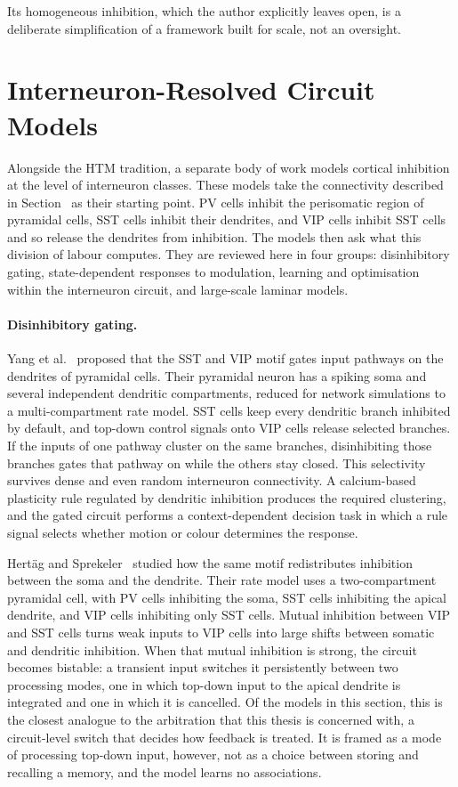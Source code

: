 Its homogeneous inhibition, which the author explicitly leaves open, is a
deliberate simplification of a framework built for scale, not an oversight.

\section{Interneuron-Resolved Circuit Models}
\label{sec:comp-interneuron}

Alongside the HTM tradition, a separate body of work models cortical inhibition
at the level of interneuron classes. These models take the connectivity
described in Section~ as their starting point. PV cells inhibit the
perisomatic region of pyramidal cells, SST cells inhibit their dendrites, and
VIP cells inhibit SST cells and so release the dendrites from inhibition. The
models then ask what this division of labour computes. They are reviewed here in
four groups: disinhibitory gating, state-dependent responses to modulation,
learning and optimisation within the interneuron circuit, and large-scale
laminar models.

\paragraph{Disinhibitory gating.}
Yang et al.~\cite{yang2016gating} proposed that the SST and VIP motif gates
input pathways on the dendrites of pyramidal cells. Their pyramidal neuron has a
spiking soma and several independent dendritic compartments, reduced for
network simulations to a multi-compartment rate model. SST cells keep every
dendritic branch inhibited by default, and top-down control signals onto VIP
cells release selected branches. If the inputs of one pathway cluster on the
same branches, disinhibiting those branches gates that pathway on while the
others stay closed. This selectivity survives dense and even random interneuron
connectivity. A calcium-based plasticity rule regulated by dendritic inhibition
produces the required clustering, and the gated circuit performs a
context-dependent decision task in which a rule signal selects whether motion or
colour determines the response.

Hertäg and Sprekeler~\cite{hertag2019amplifying} studied how the same motif
redistributes inhibition between the soma and the dendrite. Their rate model
uses a two-compartment pyramidal cell, with PV cells inhibiting the soma, SST
cells inhibiting the apical dendrite, and VIP cells inhibiting only SST cells.
Mutual inhibition between VIP and SST cells turns weak inputs to VIP cells into
large shifts between somatic and dendritic inhibition. When that mutual
inhibition is strong, the circuit becomes bistable: a transient input switches
it persistently between two processing modes, one in which top-down input to
the apical dendrite is integrated and one in which it is cancelled. Of the
models in this section, this is the closest analogue to the arbitration that
this thesis is concerned with, a circuit-level switch that decides how feedback
is treated. It is framed as a mode of processing top-down input, however, not as
a choice between storing and recalling a memory, and the model learns no
associations.

